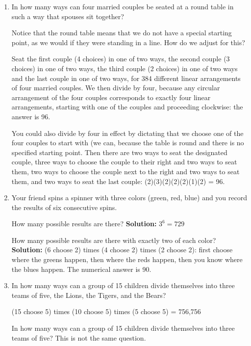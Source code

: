 \documentclass[12pt]{article}
\begin{document}
\begin{enumerate}
\newpage

\item  In how many ways can four married couples be seated at a round table in such a way that spouses sit together?

Notice that the round table means that we do not have a special starting point, as we would if they were standing in a line.  How do we adjust for this?

Seat the first couple (4 choices) in one of two ways, the second couple (3 choices) in one of two ways, the third couple (2 choices) in one of two ways and the last couple in one of two ways, for 384 different linear arrangements of four married couples.  We then divide by four, because any circular arrangement of the four couples corresponds to exactly four linear arrangements, starting with one of the couples and proceeding clockwise:  the answer is 96.

You could also divide by four in effect by dictating that we choose one of the four couples to start with (we can, because the table is round and there is no specified starting point.  Then there are two ways to seat the designated couple, three ways to choose the couple to their right and two ways to seat them, two ways to choose the couple next to the right and two ways to seat them, and two ways to seat the last couple:  (2)(3)(2)(2)(2)(1)(2) = 96.

\newpage

\item  Your friend spins a spinner with three colors (green, red, blue) and you record the results of six consecutive spins.

How many possible results are there?  {\bf Solution:}  $3^6 = 729$

How many possible results are there with exactly two of each color?  {\bf Solution:}  (6 choose 2) times (4 choose 2) times (2 choose 2):
first choose where the greens happen, then where the reds happen, then you know where the blues happen.  The numerical answer is 90.

\newpage

\item  In how many ways can a group of 15 children divide themselves into three teams of five, the Lions, the Tigers, and the Bears?

(15 choose 5) times (10 choose 5) times (5 choose 5) = 756,756

In how many ways can a group of 15 children divide themselves into three teams of five?  This is not the same question.


\end{enumerate}
\end{document}
